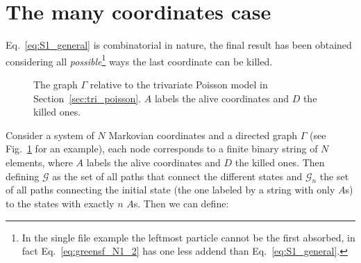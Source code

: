 \documentclass[a4paper,11pt]{amsart}
\theoremstyle{remark}
\begin{document}
 \section{The many coordinates case}
 Eq.~\eqref{eq:S1_general} is combinatorial in nature, the final result has been obtained considering all \emph{possible}\footnote{In the single file example the leftmost particle cannot be the first absorbed, in fact Eq.~\eqref{eq:greensf_N1_2} has one less addend than Eq.~\eqref{eq:S1_general}.} ways the last coordinate can be killed.\\
 \begin{figure}
   \label{fig:graph}
   \centering
    \caption{The graph $\Gamma$ relative to the trivariate Poisson model in Section~\ref{sec:tri_poisson}. $A$
labels the alive coordinates and $D$ the killed ones.}
\end{figure}
Consider a system of $N$ Markovian coordinates and a directed graph $\Gamma$ (see Fig.~\ref{fig:graph} for an example), each node corresponds to a finite binary string of $N$ elements, where $A$ labels the alive coordinates and $D$ the killed ones. Then defining $\mathcal{G}$ as the set of all paths that connect the different states and $\mathcal{G}_n$ the set of all paths connecting the initial state (the one labeled by a string with only $A$s) to the states with exactly $n$ $A$s. Then we can define:
\end{document}
